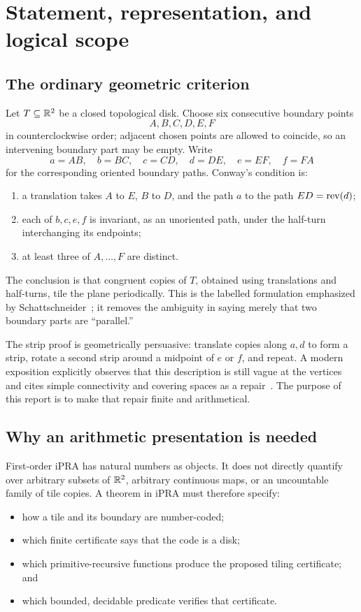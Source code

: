 \section{Statement, representation, and logical scope}
\label{sec:scope}

\subsection{The ordinary geometric criterion}

Let \(T\subseteq\mathbb R^2\) be a closed topological disk.  Choose six consecutive boundary points
\[
 A,B,C,D,E,F
\]
in counterclockwise order; adjacent chosen points are allowed to coincide, so an intervening boundary part may be empty.  Write
\[
 a=AB,\quad b=BC,\quad c=CD,\quad d=DE,\quad e=EF,\quad f=FA
\]
for the corresponding oriented boundary paths.  Conway's condition is:
\begin{enumerate}[label=(\roman*)]
\item a translation takes \(A\) to \(E\), \(B\) to \(D\), and the path \(a\) to the path \(ED=\operatorname{rev}(d)\);
\item each of \(b,c,e,f\) is invariant, as an unoriented path, under the half-turn interchanging its endpoints;
\item at least three of \(A,\ldots,F\) are distinct.
\end{enumerate}
The conclusion is that congruent copies of \(T\), obtained using translations and half-turns, tile the plane periodically.  This is the labelled formulation emphasized by Schattschneider~\cite{Schattschneider1980}; it removes the ambiguity in saying merely that two boundary parts are ``parallel.''

The strip proof is geometrically persuasive: translate copies along \(a,d\) to form a strip, rotate a second strip around a midpoint of \(e\) or \(f\), and repeat.  A modern exposition explicitly observes that this description is still vague at the vertices and cites simple connectivity and covering spaces as a repair~\cite[Remark~3.4.4]{Weber2025}.  The purpose of this report is to make that repair finite and arithmetical.

\subsection{Why an arithmetic presentation is needed}

First-order iPRA has natural numbers as objects.  It does not directly quantify over arbitrary subsets of \(\mathbb R^2\), arbitrary continuous maps, or an uncountable family of tile copies.  A theorem in iPRA must therefore specify:
\begin{itemize}
\item how a tile and its boundary are number-coded;
\item which finite certificate says that the code is a disk;
\item which primitive-recursive functions produce the proposed tiling certificate; and
\item which bounded, decidable predicate verifies that certificate.
\end{itemize}


